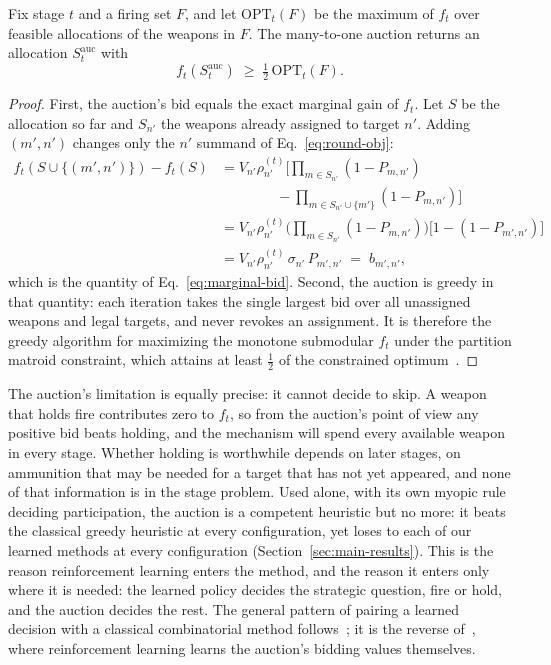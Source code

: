 \begin{proposition}
\label{prop:auction-half}
Fix stage $t$ and a firing set $F$, and let $\text{OPT}_t(F)$ be the maximum of $f_t$ over feasible allocations of the weapons in $F$. The many-to-one auction returns an allocation $S^{\text{auc}}_t$ with
\begin{equation}
f_t(S^{\text{auc}}_t) \;\geq\; \tfrac12\,\text{OPT}_t(F).
\end{equation}
\end{proposition}
\begin{proof}
First, the auction's bid equals the exact marginal gain of $f_t$. Let $S$ be the allocation so far and $S_{n'}$ the weapons already assigned to target $n'$. Adding $(m',n')$ changes only the $n'$ summand of Eq.~\eqref{eq:round-obj}:
\begin{align*}
f_t(S \cup \{(m',n')\}) - f_t(S)
&= V_{n'}\rho_{n'}^{(t)}\Big[\textstyle\prod_{m \in S_{n'}}(1-P_{m,n'}) \\
&\qquad\qquad - \textstyle\prod_{m \in S_{n'} \cup \{m'\}}(1-P_{m,n'})\Big] \\
&= V_{n'}\rho_{n'}^{(t)} \Big(\textstyle\prod_{m \in S_{n'}}(1-P_{m,n'})\Big)\big[1-(1-P_{m',n'})\big] \\
&= V_{n'}\rho_{n'}^{(t)}\,\sigma_{n'}\,P_{m',n'} \;=\; b_{m',n'},
\end{align*}
which is the quantity of Eq.~\eqref{eq:marginal-bid}. Second, the auction is greedy in that quantity: each iteration takes the single largest bid over all unassigned weapons and legal targets, and never revokes an assignment. It is therefore the greedy algorithm for maximizing the monotone submodular $f_t$ under the partition matroid constraint, which attains at least $\tfrac12$ of the constrained optimum~\cite{fisher1978analysis}.
\end{proof}

The auction's limitation is equally precise: it cannot decide to skip. A weapon that holds fire contributes zero to $f_t$, so from the auction's point of view any positive bid beats holding, and the mechanism will spend every available weapon in every stage. Whether holding is worthwhile depends on later stages, on ammunition that may be needed for a target that has not yet appeared, and none of that information is in the stage problem. Used alone, with its own myopic rule deciding participation, the auction is a competent heuristic but no more: it beats the classical greedy heuristic at every configuration, yet loses to each of our learned methods at every configuration (Section~\ref{sec:main-results}). This is the reason reinforcement learning enters the method, and the reason it enters only where it is needed: the learned policy decides the strategic question, fire or hold, and the auction decides the rest. The general pattern of pairing a learned decision with a classical combinatorial method follows~\cite{delarue2020rl}; it is the reverse of~\cite{sun2026grabbing}, where reinforcement learning learns the auction's bidding values themselves.

